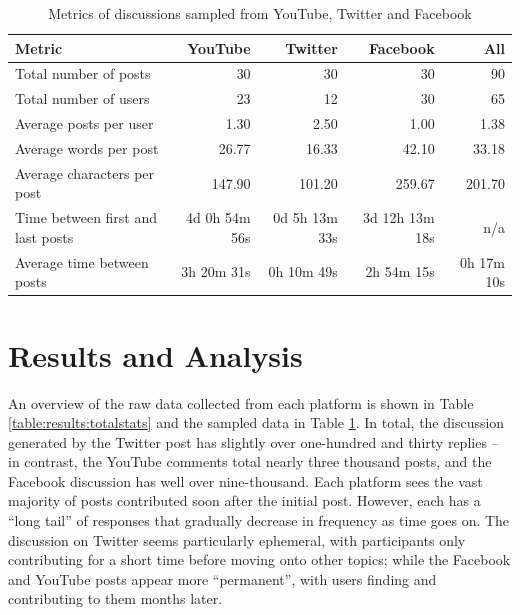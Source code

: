 \begin{table}
\centering
\caption{Metrics of discussions sampled from YouTube, Twitter and Facebook}
\label{table:results:samplestats}
\begin{tabular}{ l | r r r r }

\textbf{Metric} & \textbf{YouTube} & \textbf{Twitter} & \textbf{Facebook} & \textbf{All}\\
\hline
Total number of posts & 30 & 30 & 30 & 90\\

Total number of users & 23 & 12 & 30 & 65\\

Average posts per user & 1.30 & 2.50 & 1.00 & 1.38\\

Average words per post & 26.77 & 16.33 & 42.10 & 33.18\\

Average characters per post & 147.90 & 101.20 & 259.67 & 201.70\\

Time between first and last posts & 4d 0h 54m 56s & 0d 5h 13m 33s & 3d 12h 13m 18s & n/a\\

Average time between posts & 3h 20m 31s & 0h 10m 49s & 2h 54m 15s & 0h 17m 10s\\

\end{tabular}
\end{table}

\section{Results and Analysis}
\label{investigation:results}
An overview of the raw data collected from each platform is shown in Table \ref{table:results:totalstats} and the sampled data in Table \ref{table:results:samplestats}. In total, the discussion generated by the Twitter post has slightly over one-hundred and thirty replies -- in contrast, the  YouTube comments total nearly three thousand posts, and the Facebook discussion has well over nine-thousand. Each platform sees the vast majority of posts contributed soon after the initial post. However, each has a ``long tail'' of responses that gradually decrease in frequency as time goes on. The discussion on Twitter seems particularly ephemeral, with participants only contributing for a short time before moving onto other topics; while the Facebook and YouTube posts appear more ``permanent'', with users finding and contributing to them months later.

